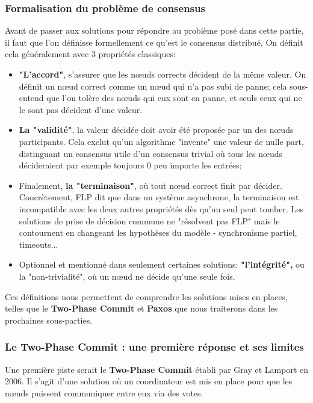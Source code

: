 \documentclass[12pt,a4paper]{article}
\begin{document}
\subsubsection{Formalisation du problème de consensus}
Avant de passer aux solutions pour répondre au problème posé dans cette partie, il faut que l'on définisse formellement ce qu'est le consensus distribué. On définit cela généralement avec 3 propriétés classiques:
\vspace{0.25cm}
\begin{itemize}
    \item \textbf{"L'accord"}, s'assurer que les nœuds corrects décident de la même valeur. On définit un nœud correct comme un nœud qui n'a pas subi de panne; cela sous-entend que l'on tolère des nœuds qui eux sont en panne, et seuls ceux qui ne le sont pas décident d'une valeur.
    \item \textbf{La "validité"}, la valeur décidée doit avoir été proposée par un des nœuds participants. Cela exclut qu'un algorithme "invente" une valeur de nulle part, distinguant un consensus utile d'un consensus trivial où tous les nœuds décideraient par exemple toujours 0 peu importe les entrées;
    \item Finalement, \textbf{la "terminaison"}, où tout nœud correct finit par décider. Concrètement, FLP %
    \cite{FLP1985} dit que dans un système asynchrone, la terminaison est incompatible avec les deux autres propriétés dès qu'un seul peut tomber. Les solutions de prise de décision commune ne "résolvent pas FLP" mais le contournent en changeant les hypothèses du modèle - synchronisme partiel, timeouts...
    \item Optionnel et mentionné dans seulement certaines solutions: \textbf{"l’intégrité",} ou la "non-trivialité", où un nœud ne décide qu'une seule fois.
\end{itemize}
\vspace{0.25cm}
Ces définitions nous permettent de comprendre les solutions mises en places, telles que le \textbf{Two-Phase Commit}\cite{GrayLamport2006} et \textbf{Paxos}\cite{PaxosSimple2001} que nous traiterons dans les prochaines sous-parties.

\subsubsection{Le Two-Phase Commit : une première réponse et ses limites}
Une première piste serait le \textbf{Two-Phase Commit}\cite{GrayLamport2006} établi par Gray et Lamport en 2006. Il s'agit d'une solution où un coordinateur est mis en place pour que les nœuds puissent communiquer entre eux via des votes.
\end{document}
